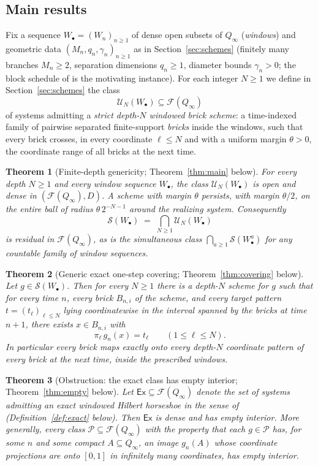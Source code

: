 \documentclass[11pt]{article}
\newtheorem{theorem}{Theorem}[section]
\newcommand{\Q}{Q_\infty}
\newcommand{\F}{\mathcal{F}}
\newcommand{\EX}{\mathsf{Ex}}
\begin{document}
\subsection*{Main results}

Fix a sequence $W_\bullet=(W_n)_{n\ge 1}$ of dense open subsets of $\Q$ (\emph{windows})
and geometric data $(M_n,q_n,\gamma_n)_{n\ge1}$ as in Section~\ref{sec:schemes}
(finitely many branches $M_n\ge 2$, separation dimensions $q_n\ge 1$, diameter bounds
$\gamma_n>0$; the block schedule of \cite[Section~12]{Shmalo2026} is the motivating
instance).  For each integer $N\ge 1$ we define in Section~\ref{sec:schemes} the class
\[
\mathcal U_N(W_\bullet)\subseteq\F(\Q)
\]
of systems admitting a \emph{strict depth-$N$ windowed brick scheme}: a time-indexed
family of pairwise separated finite-support \emph{bricks} inside the windows, such that
every brick crosses, in every coordinate $\ell\le N$ and with a uniform margin
$\theta>0$, the coordinate range of all bricks at the next time.

\begin{theorem}[Finite-depth genericity; Theorem~\ref{thm:main} below]\label{thm:A}
For every depth $N\ge1$ and every window sequence $W_\bullet$, the class
$\mathcal U_N(W_\bullet)$ is open and dense in $(\F(\Q),D)$.  A scheme with margin
$\theta$ persists, with margin $\theta/2$, on the entire ball of radius
$\theta\,2^{-N-1}$ around the realizing system.  Consequently
\[
\mathcal S(W_\bullet)\;=\;\bigcap_{N\ge1}\mathcal U_N(W_\bullet)
\]
is residual in $\F(\Q)$, as is the simultaneous class
$\bigcap_{a\ge1}\mathcal S(W^a_\bullet)$ for any countable family of window sequences.
\end{theorem}

\begin{theorem}[Generic exact one-step covering; Theorem~\ref{thm:covering} below]\label{thm:B}
Let $g\in\mathcal S(W_\bullet)$.  Then for every $N\ge 1$ there is a depth-$N$ scheme
for $g$ such that for every time $n$, every brick $B_{n,i}$ of the scheme, and every
target pattern $t=(t_\ell)_{\ell\le N}$ lying coordinatewise in the interval spanned
by the bricks at time $n+1$, there exists $x\in B_{n,i}$ with
\[
\pi_\ell\,g_n(x)=t_\ell\qquad(1\le\ell\le N).
\]
In particular every brick maps exactly onto every depth-$N$ coordinate pattern of every
brick at the next time, inside the prescribed windows.
\end{theorem}

\begin{theorem}[Obstruction: the exact class has empty interior; Theorem~\ref{thm:empty} below]\label{thm:C}
Let $\EX\subseteq\F(\Q)$ denote the set of systems admitting an exact windowed Hilbert
horseshoe in the sense of \cite[Definition~12.1]{Shmalo2026}
(Definition~\ref{def:exact} below).  Then $\EX$ is dense and has empty interior.
More generally, every class $\mathcal P\subseteq\F(\Q)$ with the property that each
$g\in\mathcal P$ has, for some $n$ and some compact $A\subseteq\Q$, an image $g_n(A)$
whose coordinate projections are onto $[0,1]$ in infinitely many coordinates, has empty
interior.
\end{theorem}
\end{document}

